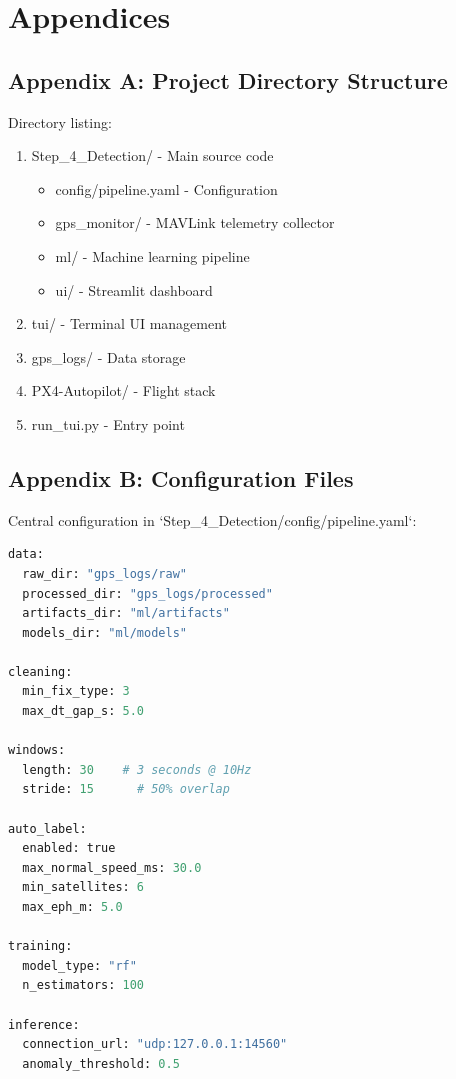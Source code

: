\section{Appendices}

\subsection{Appendix A: Project Directory Structure}

Directory listing:
\begin{enumerate}
    \item Step_4_Detection/ - Main source code
    \begin{itemize}
        \item config/pipeline.yaml - Configuration
        \item gps\_monitor/ - MAVLink telemetry collector
        \item ml/ - Machine learning pipeline
        \item ui/ - Streamlit dashboard
    \end{itemize}
    \item tui/ - Terminal UI management
    \item gps\_logs/ - Data storage
    \item PX4-Autopilot/ - Flight stack
    \item run\_tui.py - Entry point
\end{enumerate}

\subsection{Appendix B: Configuration Files}

Central configuration in `Step_4_Detection/config/pipeline.yaml`:

\begin{lstlisting}[language=python, style=pythonstyle]
data:
  raw_dir: "gps_logs/raw"
  processed_dir: "gps_logs/processed"
  artifacts_dir: "ml/artifacts"
  models_dir: "ml/models"

cleaning:
  min_fix_type: 3
  max_dt_gap_s: 5.0

windows:
  length: 30    # 3 seconds @ 10Hz
  stride: 15      # 50% overlap

auto_label:
  enabled: true
  max_normal_speed_ms: 30.0
  min_satellites: 6
  max_eph_m: 5.0

training:
  model_type: "rf"
  n_estimators: 100

inference:
  connection_url: "udp:127.0.0.1:14560"
  anomaly_threshold: 0.5
\end{lstlisting}

